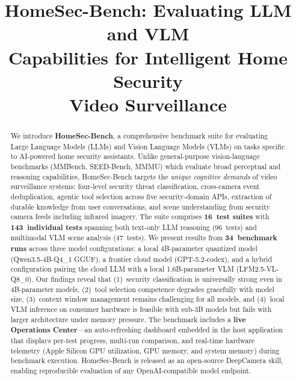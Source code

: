 \documentclass[conference]{IEEEtran}
\begin{document}
\title{HomeSec-Bench: Evaluating LLM and VLM\\
Capabilities for Intelligent Home Security\\Video Surveillance}

\author{
}

\maketitle


\begin{abstract}
We introduce \textbf{HomeSec-Bench}, a comprehensive benchmark suite for
evaluating Large Language Models (LLMs) and Vision Language Models (VLMs) on
tasks specific to AI-powered home security assistants. Unlike general-purpose
vision-language benchmarks (MMBench, SEED-Bench, MMMU) which evaluate broad
perceptual and reasoning capabilities, HomeSec-Bench targets the
\emph{unique cognitive demands} of video surveillance systems: four-level
security threat classification, cross-camera event deduplication, agentic
tool selection across five security-domain APIs, extraction of durable
knowledge from user conversations, and scene understanding from security
camera feeds including infrared imagery. The suite comprises
\textbf{16~test suites} with \textbf{143~individual tests} spanning both
text-only LLM reasoning (96~tests) and multimodal VLM scene analysis
(47~tests). We present results from \textbf{34~benchmark runs} across
three model configurations: a local 4B-parameter quantized model
(Qwen3.5-4B-Q4\_1 GGUF), a frontier cloud model (GPT-5.2-codex), and a
hybrid configuration pairing the cloud LLM with a local 1.6B-parameter
VLM (LFM2.5-VL-Q8\_0). Our findings reveal that (1)~security
classification is universally strong even in 4B-parameter models,
(2)~tool selection competence degrades gracefully with model size,
(3)~context window management remains challenging for all models, and
(4)~local VLM inference on consumer hardware is feasible with sub-3B
models but fails with larger architecture under memory pressure.
The benchmark includes a \textbf{live Operations Center}---an
auto-refreshing dashboard embedded in the host application that
displays per-test progress, multi-run comparison, and real-time
hardware telemetry (Apple Silicon GPU utilization, GPU memory, and
system memory) during benchmark execution.
HomeSec-Bench is released as an open-source DeepCamera skill, enabling
reproducible evaluation of any OpenAI-compatible model endpoint.
\end{abstract}
\end{document}
